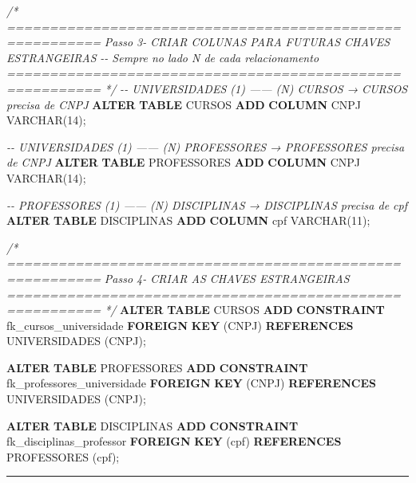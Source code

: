 \documentclass[
]{book}
\newenvironment{Shaded}{\begin{snugshade}}{\end{snugshade}}
\newcommand{\CommentTok}[1]{\textcolor[rgb]{0.56,0.35,0.01}{\textit{#1}}}
\newcommand{\DataTypeTok}[1]{\textcolor[rgb]{0.13,0.29,0.53}{#1}}
\newcommand{\DecValTok}[1]{\textcolor[rgb]{0.00,0.00,0.81}{#1}}
\newcommand{\KeywordTok}[1]{\textcolor[rgb]{0.13,0.29,0.53}{\textbf{#1}}}
\newcommand{\NormalTok}[1]{#1}
\begin{document}
\begin{Shaded}
\begin{Highlighting}[]
\CommentTok{/* =========================================================}
\CommentTok{   Passo 3{-} CRIAR COLUNAS PARA FUTURAS CHAVES ESTRANGEIRAS}
\CommentTok{   {-}{-} Sempre no lado N de cada relacionamento}
\CommentTok{   ========================================================= */}
\CommentTok{{-}{-} UNIVERSIDADES (1) —— (N) CURSOS  → CURSOS precisa de CNPJ}
\KeywordTok{ALTER} \KeywordTok{TABLE}\NormalTok{ CURSOS   }\KeywordTok{ADD} \KeywordTok{COLUMN}\NormalTok{ CNPJ }\DataTypeTok{VARCHAR}\NormalTok{(}\DecValTok{14}\NormalTok{);}

\CommentTok{{-}{-} UNIVERSIDADES (1) —— (N) PROFESSORES → PROFESSORES precisa de CNPJ}
\KeywordTok{ALTER} \KeywordTok{TABLE}\NormalTok{ PROFESSORES  }\KeywordTok{ADD} \KeywordTok{COLUMN}\NormalTok{ CNPJ }\DataTypeTok{VARCHAR}\NormalTok{(}\DecValTok{14}\NormalTok{);}

\CommentTok{{-}{-} PROFESSORES (1) —— (N) DISCIPLINAS → DISCIPLINAS precisa de cpf}
\KeywordTok{ALTER} \KeywordTok{TABLE}\NormalTok{ DISCIPLINAS }\KeywordTok{ADD} \KeywordTok{COLUMN}\NormalTok{ cpf }\DataTypeTok{VARCHAR}\NormalTok{(}\DecValTok{11}\NormalTok{);}

\CommentTok{/* =========================================================}
\CommentTok{   Passo 4{-} CRIAR AS CHAVES ESTRANGEIRAS}
\CommentTok{   ========================================================= */}
\KeywordTok{ALTER} \KeywordTok{TABLE}\NormalTok{ CURSOS      }\KeywordTok{ADD} \KeywordTok{CONSTRAINT}\NormalTok{ fk\_cursos\_universidade      }\KeywordTok{FOREIGN} \KeywordTok{KEY}\NormalTok{ (CNPJ) }\KeywordTok{REFERENCES}\NormalTok{ UNIVERSIDADES (CNPJ);}

\KeywordTok{ALTER} \KeywordTok{TABLE}\NormalTok{ PROFESSORES }\KeywordTok{ADD} \KeywordTok{CONSTRAINT}\NormalTok{ fk\_professores\_universidade }\KeywordTok{FOREIGN} \KeywordTok{KEY}\NormalTok{ (CNPJ) }\KeywordTok{REFERENCES}\NormalTok{ UNIVERSIDADES (CNPJ);}

\KeywordTok{ALTER} \KeywordTok{TABLE}\NormalTok{ DISCIPLINAS }\KeywordTok{ADD} \KeywordTok{CONSTRAINT}\NormalTok{ fk\_disciplinas\_professor    }\KeywordTok{FOREIGN} \KeywordTok{KEY}\NormalTok{ (cpf)  }\KeywordTok{REFERENCES}\NormalTok{ PROFESSORES (cpf);}
\end{Highlighting}
\end{Shaded}

\begin{center}\rule{0.5\linewidth}{0.5pt}\end{center}
\end{document}
